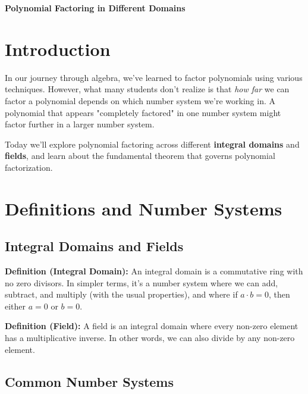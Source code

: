 \documentclass[12pt]{article}
\begin{document}
\begin{center}
\textbf{\Large Polynomial Factoring in Different Domains} \\
\vspace{0.5cm}
\hspace{0.1\textwidth}
\end{center}

\vspace{0.5cm}

\section{Introduction}

In our journey through algebra, we've learned to factor polynomials using various techniques. However, what many students don't realize is that \textit{how far} we can factor a polynomial depends on which number system we're working in. A polynomial that appears "completely factored" in one number system might factor further in a larger number system.

Today we'll explore polynomial factoring across different \textbf{integral domains} and \textbf{fields}, and learn about the fundamental theorem that governs polynomial factorization.

\section{Definitions and Number Systems}

\subsection{Integral Domains and Fields}

\textbf{Definition (Integral Domain):} An integral domain is a commutative ring with no zero divisors. In simpler terms, it's a number system where we can add, subtract, and multiply (with the usual properties), and where if $a \cdot b = 0$, then either $a = 0$ or $b = 0$.

\textbf{Definition (Field):} A field is an integral domain where every non-zero element has a multiplicative inverse. In other words, we can also divide by any non-zero element.

\subsection{Common Number Systems}
\end{document}
